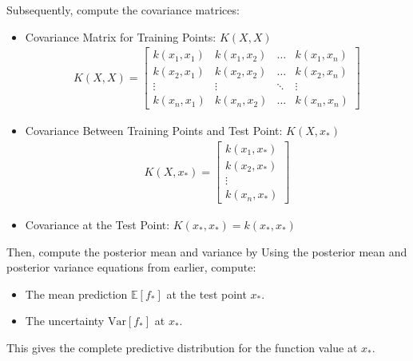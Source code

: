 Subsequently, compute the covariance matrices:
\begin{itemize}
	\item Covariance Matrix for Training Points: $K(X, X)$
		\begin{align*}
			K(X, X) = \begin{bmatrix}
				k(x_1, x_1) & k(x_1, x_2) & \dots & k(x_1, x_n) \\
				k(x_2, x_1) & k(x_2, x_2) & \dots & k(x_2, x_n) \\
				\vdots & \vdots & \ddots & \vdots \\
				k(x_n, x_1) & k(x_n, x_2) & \dots & k(x_n, x_n)
			\end{bmatrix}
		\end{align*}
	\item Covariance Between Training Points and Test Point: $K(X, x_*)$
		\begin{align*}
			K(X, x_*) = \begin{bmatrix}
				k(x_1, x_*) \\
				k(x_2, x_*) \\
				\vdots \\
				k(x_n, x_*)
			\end{bmatrix}
		\end{align*}
	\item Covariance at the Test Point: $K(x_*, x_*) = k(x_*, x_*)$
\end{itemize}
Then, compute the posterior mean and variance by Using the posterior mean and posterior variance equations from earlier, compute:
\begin{itemize}
	\item The mean prediction $\mathbb{E}[f_*]$ at the test point $x_*$.
	\item The uncertainty $\text{Var}[f_*]$ at $x_*$.
\end{itemize}
This gives the complete predictive distribution for the function value at $x_*$.

